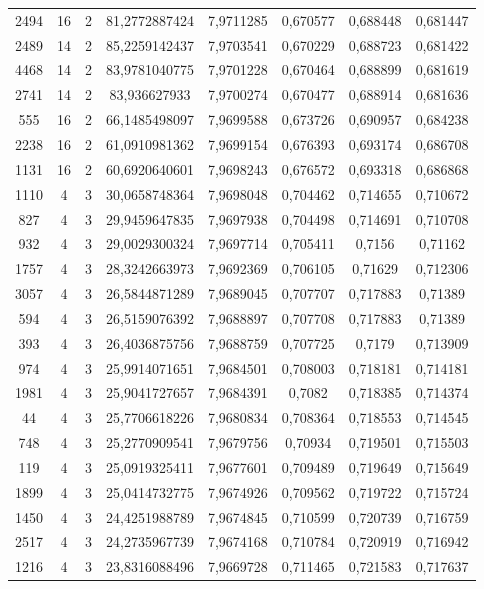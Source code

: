 \begin{longtable}{|c|c|c|c|c|c|c|c|}
2494 & 16 & 2 & 81,2772887424 & 7,9711285 & 0,670577 & 0,688448 & 0,681447 \\
2489 & 14 & 2 & 85,2259142437 & 7,9703541 & 0,670229 & 0,688723 & 0,681422 \\
4468 & 14 & 2 & 83,9781040775 & 7,9701228 & 0,670464 & 0,688899 & 0,681619 \\
2741 & 14 & 2 & 83,936627933 & 7,9700274 & 0,670477 & 0,688914 & 0,681636 \\
555 & 16 & 2 & 66,1485498097 & 7,9699588 & 0,673726 & 0,690957 & 0,684238 \\
2238 & 16 & 2 & 61,0910981362 & 7,9699154 & 0,676393 & 0,693174 & 0,686708 \\
1131 & 16 & 2 & 60,6920640601 & 7,9698243 & 0,676572 & 0,693318 & 0,686868 \\
1110 & 4 & 3 & 30,0658748364 & 7,9698048 & 0,704462 & 0,714655 & 0,710672 \\
827 & 4 & 3 & 29,9459647835 & 7,9697938 & 0,704498 & 0,714691 & 0,710708 \\
932 & 4 & 3 & 29,0029300324 & 7,9697714 & 0,705411 & 0,7156 & 0,71162 \\
1757 & 4 & 3 & 28,3242663973 & 7,9692369 & 0,706105 & 0,71629 & 0,712306 \\
3057 & 4 & 3 & 26,5844871289 & 7,9689045 & 0,707707 & 0,717883 & 0,71389 \\
594 & 4 & 3 & 26,5159076392 & 7,9688897 & 0,707708 & 0,717883 & 0,71389 \\
393 & 4 & 3 & 26,4036875756 & 7,9688759 & 0,707725 & 0,7179 & 0,713909 \\
974 & 4 & 3 & 25,9914071651 & 7,9684501 & 0,708003 & 0,718181 & 0,714181 \\
1981 & 4 & 3 & 25,9041727657 & 7,9684391 & 0,7082 & 0,718385 & 0,714374 \\
44 & 4 & 3 & 25,7706618226 & 7,9680834 & 0,708364 & 0,718553 & 0,714545 \\
748 & 4 & 3 & 25,2770909541 & 7,9679756 & 0,70934 & 0,719501 & 0,715503 \\
119 & 4 & 3 & 25,0919325411 & 7,9677601 & 0,709489 & 0,719649 & 0,715649 \\
1899 & 4 & 3 & 25,0414732775 & 7,9674926 & 0,709562 & 0,719722 & 0,715724 \\
1450 & 4 & 3 & 24,4251988789 & 7,9674845 & 0,710599 & 0,720739 & 0,716759 \\
2517 & 4 & 3 & 24,2735967739 & 7,9674168 & 0,710784 & 0,720919 & 0,716942 \\
1216 & 4 & 3 & 23,8316088496 & 7,9669728 & 0,711465 & 0,721583 & 0,717637 \\

\end{longtable}
